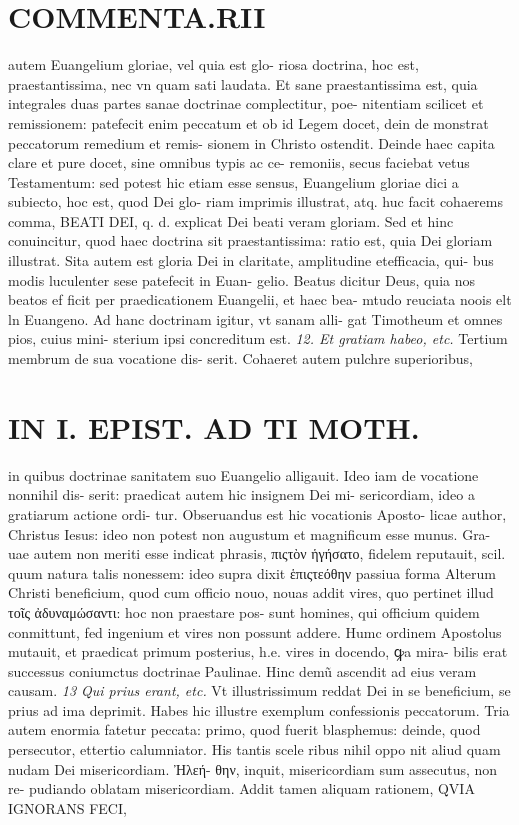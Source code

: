\documentclass{article}
\begin{document}
\begin{pages}
\section*{COMMENTA.RII }\pstart autem Euangelium gloriae, vel quia est glo- riosa doctrina, hoc est, praestantissima, nec vn quam sati laudata.  \pend\pstart Et sane praestantissima est, quia integrales duas partes sanae doctrinae complectitur, poe- nitentiam scilicet et remissionem: patefecit enim peccatum et ob id Legem docet, dein de monstrat peccatorum remedium et remis- sionem in Christo ostendit. Deinde haec capita clare et pure docet, sine omnibus typis ac ce- remoniis, secus faciebat vetus Testamentum: sed potest hic etiam esse sensus, Euangelium gloriae dici a subiecto, hoc est, quod Dei glo- riam imprimis illustrat, atq. huc facit cohaerems comma, BEATI DEI, q. d. explicat Dei beati veram gloriam. Sed et hinc conuincitur, quod haec doctrina sit praestantissima: ratio est, quia Dei gloriam illustrat. Sita autem est gloria Dei in claritate, amplitudine etefficacia, qui- bus modis luculenter sese patefecit in Euan- gelio. Beatus dicitur Deus, quia nos beatos ef ficit per praedicationem Euangelii, et haec bea- mtudo reuciata noois elt ln Euangeno.  \pend\pstart Ad hanc doctrinam igitur, vt sanam alli- gat Timotheum et omnes pios, cuius mini- sterium ipsi concreditum est.  \pend
\textit{12. Et gratiam habeo, etc. }\pstart Tertium membrum de sua vocatione dis- serit. Cohaeret autem pulchre superioribus,  \pend
\section*{IN I. EPIST. AD TI MOTH. }
\marginpar{[ p.31 ]}\pstart in quibus doctrinae sanitatem suo Euangelio alligauit. Ideo iam de vocatione nonnihil dis- serit: praedicat autem hic insignem Dei mi- sericordiam, ideo a gratiarum actione ordi- tur. Obseruandus est hic vocationis Aposto- licae author, Christus Iesus: ideo non potest non augustum et magnificum esse munus. Gra- uae autem non meriti esse indicat phrasis, πιςτὸν ἡγήσατο, fidelem reputauit, scil. quum natura talis nonessem: ideo supra dixit ἑπιςτεόθην passiua forma Alterum Christi beneficium, quod cum officio nouo, nouas addit vires, quo pertinet illud τοῖς ἀδυναμώσαντι: hoc non praestare pos- sunt homines, qui officium quidem conmittunt, fed ingenium et vires non possunt addere. Humc ordinem Apostolus mutauit, et praedicat primum posterius, h.e. vires in docendo, ꝙa mira- bilis erat successus coniumctus doctrinae Paulinae. Hinc demũ ascendit ad eius veram causam.  \pend
\textit{13 Qui prius erant, etc. }\pstart Vt illustrissimum reddat Dei in se beneficium, se prius ad ima deprimit. Habes hic illustre exemplum confessionis peccatorum. Tria autem enormia fatetur peccata: primo, quod fuerit blasphemus: deinde, quod persecutor, ettertio calumniator. His tantis scele ribus nihil oppo nit aliud quam nudam Dei misericordiam. Ἠλεή- θην, inquit, misericordiam sum assecutus, non re- pudiando oblatam misericordiam. Addit tamen aliquam rationem, QVIA IGNORANS FECI,  \pend
\marginpar{[ p.32 ]}

\end{pages}
\end{document}
